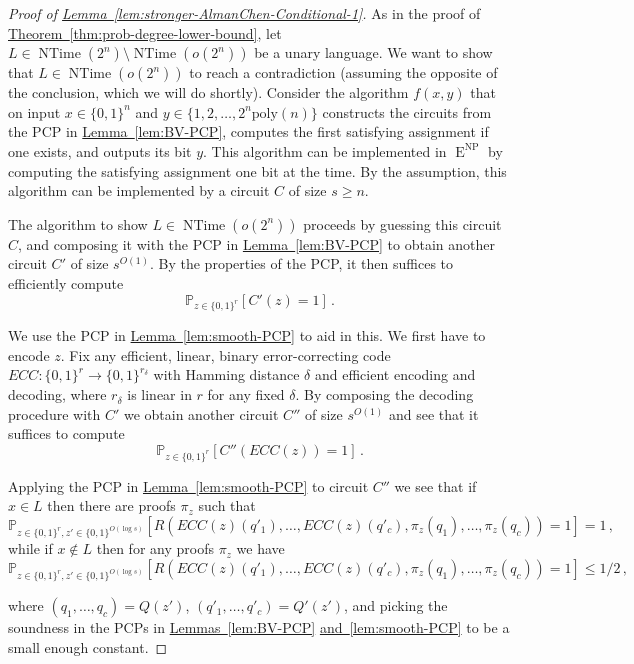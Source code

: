 \documentclass[11pt]{article}
\newcommand{\expref}[2]{\texorpdfstring{\hyperref[#2]{#1~\ref{#2}}}{#1~\ref{#2}}}
\DeclareMathOperator{\NTime}{\mathrm{NTime}}  %
\DeclareMathOperator{\NP}{\mathrm{NP}}  %
\DeclareMathOperator{\EEE}{\mathrm{E}}  %
\newcommand{\zo}{\{0, 1\}}
\renewcommand{\P}{\mathbb{P}}
\newcommand{\poly}{\mathrm{poly}}
\begin{document}
\begin{proof}[Proof of \expref{Lemma}{lem:stronger-AlmanChen-Conditional-1}]
As in the
proof of \expref{Theorem}{thm:prob-degree-lower-bound},
let $L\in\mathrm{\NTime}(2^{n})\setminus\mathrm{\NTime}(o(2^{n}))$
\cite{Cook73,SeiferasFM78,Zak83} be a unary language. We want to
show that $L\in\mathrm{\NTime}(o(2^{n}))$ to reach a contradiction
(assuming the opposite of the conclusion, which we will do shortly).
Consider the algorithm $f(x,y)$ that on input $x\in\zo^{n}$ and
$y\in\{1,2,\ldots,2^{n}\poly(n)\}$ constructs the circuits from the
PCP in \expref{Lemma}{lem:BV-PCP}, computes the first satisfying assignment
if one exists, and outputs its bit $y$. This algorithm can be implemented
in $\EEE^{\NP}$ by computing the satisfying assignment one bit at the
time. By the assumption, this algorithm can be implemented by a circuit
$C$ of size $s\ge n$.

The algorithm to show %
$L\in \mathrm{\NTime}(o(2^{n}))$   %
proceeds by guessing
this circuit $C$, and composing it with the PCP in \expref{Lemma}{lem:BV-PCP}
to obtain another circuit $C'$ of size $s^{O(1)}$. By the properties
of the PCP, it then suffices to efficiently compute
\[
\P_{z\in\zo^{r}}[C'(z)=1]\,.
\]

We use the PCP in \expref{Lemma}{lem:smooth-PCP} to aid in this. We first
have to encode $z$. Fix any efficient, linear, binary error-correcting
code $ECC:\zo^{r}\to\zo^{r_{\delta}}$ with Hamming distance $\delta$
and efficient encoding and decoding, where $r_{\delta}$ is linear
in $r$ for any fixed $\delta$. By composing the decoding procedure
with $C'$ we obtain another circuit $C''$ of size $s^{O(1)}$ and
see that it suffices to compute
\[
\P_{z\in\zo^{r}}[C''(ECC(z))=1]\,.
\]

Applying the PCP in \expref{Lemma}{lem:smooth-PCP} to circuit $C''$
we see that if $x\in L$ then there are proofs $\pi_{z}$ such that
\[
\P_{z\in\zo^{r},z'\in\zo^{O(\log s)}}[R(ECC(z)(q'_{1}),\ldots,ECC(z)(q'_{c}),\pi_{z}(q_{1}),\ldots,\pi_{z}(q_{c}))=1]=1\,,
\]
while if $x\not\in L$ then for any proofs $\pi_{z}$ we have
\[
\P_{z\in\zo^{r},z'\in\zo^{O(\log s)}}[R(ECC(z)(q'_{1}),\ldots,ECC(z)(q'_{c}),\pi_{z}(q_{1}),\ldots,\pi_{z}(q_{c}))=1]\le1/2\,,
\]

where $(q_{1},\ldots,q_{c})=Q(z')$, $(q'_{1},\ldots,q'_{c})=Q'(z')$,
and picking the soundness in the PCPs in \expref{Lemmas}{lem:BV-PCP}
\expref{and}{lem:smooth-PCP} to be a small enough constant.


\end{proof}
\end{document}
